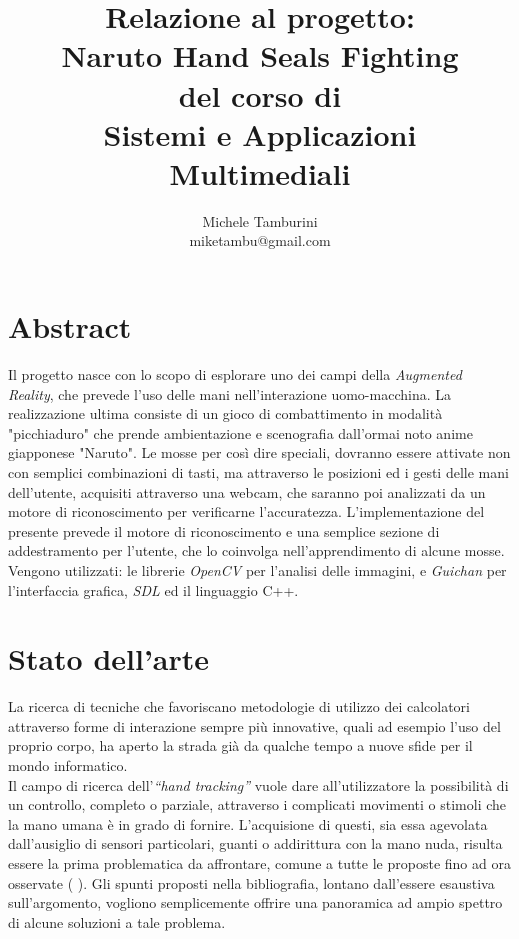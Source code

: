 \documentclass[a4paper,10pt, twocolumn]{article}
\title{Relazione al progetto: \\ Naruto Hand Seals Fighting\\ del corso di\\Sistemi e Applicazioni
Multimediali}
\author{Michele Tamburini \\ miketambu@gmail.com}
\begin{document}
\maketitle

\section{Abstract}
Il progetto nasce con lo scopo di esplorare uno dei campi della \emph{Augmented Reality}, che
prevede l'uso delle mani nell'interazione uomo-macchina.
La realizzazione ultima consiste di un gioco di combattimento in modalità "picchiaduro"
che prende ambientazione e scenografia dall'ormai noto anime giapponese "Naruto".
Le mosse per così dire speciali, dovranno essere attivate non con semplici
combinazioni di tasti, ma attraverso le posizioni ed i gesti delle mani dell'utente,
acquisiti attraverso una webcam, che saranno poi analizzati da un motore di
riconoscimento per verificarne l'accuratezza.
L'implementazione del presente prevede il 
motore di riconoscimento e una semplice sezione di addestramento
per l'utente, che lo coinvolga nell'apprendimento di alcune mosse.\\
Vengono utilizzati: le librerie \emph{OpenCV} per l'analisi delle immagini, e
\emph{Guichan} per l'interfaccia grafica, \emph{SDL} ed il linguaggio C++.

\section{Stato dell'arte}
La ricerca di tecniche che favoriscano metodologie di utilizzo dei calcolatori
attraverso forme di interazione sempre pi\`{u} innovative, quali ad esempio
l'uso del proprio corpo, ha aperto la strada gi\`{a} da qualche tempo
a nuove sfide per il mondo informatico.\\
Il campo di ricerca dell'\emph{``hand tracking''} vuole dare all'utilizzatore
la possibilit\`{a} di un controllo, completo o parziale,
attraverso i complicati movimenti o stimoli che la mano umana \`{e} in grado di fornire.
L'acquisione di questi, sia essa agevolata dall'ausiglio di sensori particolari,
guanti o addirittura con la mano nuda, risulta essere la prima problematica da affrontare,
comune a tutte le proposte fino ad ora osservate (\cite{handTrackHCI} \cite{handTrackNoMarkers}
 \cite{handNavigator} \cite{hugeSurvey} \cite{mitGlove}). 
 Gli spunti proposti nella bibliografia, lontano
dall'essere esaustiva sull'argomento, vogliono semplicemente offrire una panoramica ad ampio
spettro di alcune soluzioni a tale problema.
\end{document}
